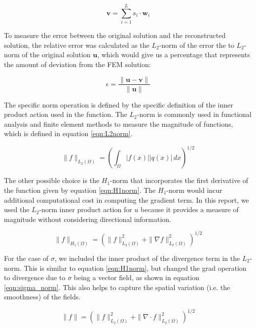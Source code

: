 \begin{equation}
    \mathbf{v} = \sum_{i=1}^{L} s_i \cdot \mathbf{w}_i 
    \label{eqn:reconstruction}
\end{equation}

To measure the error between the original solution and the reconstructed solution, the relative error was calculated as the $L_2$-norm of the error the to $L_2$-norm of the original solution $\mathbf{u}$, which would give us a percentage that represents the amount of deviation from the FEM solution:

\begin{equation}
   \epsilon = \frac{\| \mathbf{u} - \mathbf{v} \|}{\| \mathbf{u} \|}
   \label{eqn:norm_error}
\end{equation}

The specific norm operation is defined by the specific definition of the inner product action used in the function. The $L_2$-norm is commonly used in functional analysis and finite element methods to measure the magnitude of functions, which is defined in equation \ref{eqn:L2norm}. 

\begin{equation}
    \| f \|_{L_2(\Omega)} = \left( \int_{\Omega} |f(x)| |q(x)| \, dx \right)^{1/2}
    \label{eqn:L2norm}
\end{equation}

The other possible choice is the $H_1$-norm that incorporates the first derivative of the function given by equation \ref{eqn:H1norm}. The $H_1$-norm would incur additional computational cost in computing the gradient term. In this report, we used the $L_2$-norm inner product action for $u$ because it provides a measure of magnitude without considering directional information. 

\begin{equation}
    \| f \|_{H_1(\Omega)} = \left( \| f \|_{L_2(\Omega)}^2 + \| \nabla f \|_{L_2(\Omega)}^2 \right)^{1/2}
    \label{eqn:H1norm}
\end{equation}

For the case of $\sigma$, we included the inner product of the divergence term in the $L_2$-norm. This is similar to equation \ref{eqn:H1norm}, but changed the grad operation to divergence due to $\sigma$ being a vector field, as shown in equation 
\ref{eqn:sigma_norm}. This also helps to capture the spatial variation (i.e. the smoothness) of the fields. 

\begin{equation}
    \| f \| = \left( \| f \|_{L_2(\Omega)}^2 + \| \nabla \cdot f \|_{L_2(\Omega)}^2 \right)^{1/2}
    \label{eqn:sigma_norm}
\end{equation}

